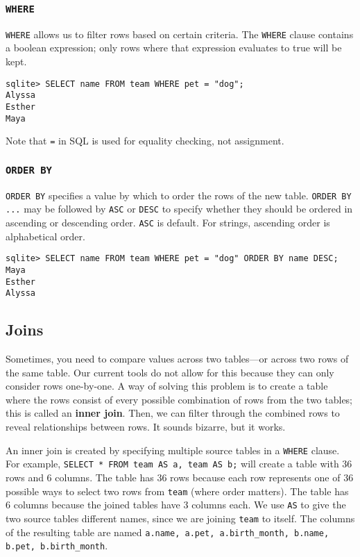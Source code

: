 \subsubsection{\lstinline{WHERE}}
\lstinline{WHERE} allows us to filter rows based on certain criteria.  The \lstinline{WHERE} clause contains a boolean expression; only rows where that expression evaluates to true will be kept.  
\begin{lstlisting}
sqlite> SELECT name FROM team WHERE pet = "dog"; 
Alyssa
Esther
Maya
\end{lstlisting}

Note that \lstinline{=} in SQL is used for equality checking, not assignment. 

\subsubsection{\lstinline{ORDER BY}}
\lstinline{ORDER BY} specifies a value by which to order the rows of the new table. \lstinline{ORDER BY ...} may be followed by \lstinline{ASC} or \lstinline{DESC} to specify whether they should be ordered in ascending or descending order. \lstinline{ASC} is default. For strings, ascending order is alphabetical order.

\begin{lstlisting}
sqlite> SELECT name FROM team WHERE pet = "dog" ORDER BY name DESC; 
Maya
Esther
Alyssa
\end{lstlisting}

\subsection{Joins}
Sometimes, you need to compare values across two tables---or across two rows of the same table. Our current tools do not allow for this because they can only consider rows one-by-one. A way of solving this problem is to create a table where the rows consist of every possible combination of rows from the two tables; this is called an \textbf{inner join}. Then, we can filter through the combined rows to reveal relationships between rows. It sounds bizarre, but it works. 

An inner join is created by specifying multiple source tables in a \lstinline{WHERE} clause. For example, \lstinline{SELECT * FROM team AS a, team AS b;} will create a table with 36 rows and 6 columns. The table has 36 rows because each row represents one of 36 possible ways to select two rows from \lstinline{team} (where order matters). The table has 6 columns because the joined tables have 3 columns each. We use \lstinline{AS} to give the two source tables different names, since we are joining \lstinline{team} to itself. The columns of the resulting table are named \lstinline{a.name, a.pet, a.birth_month, b.name, b.pet, b.birth_month}. 

